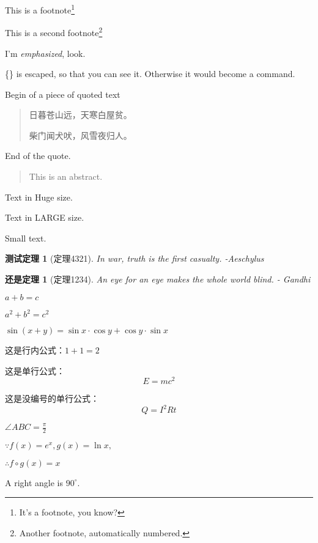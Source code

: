 \documentclass[UTF8]{ctexart}
\begin{document}
This is a footnote\footnote{It's a footnote, you know?}

This is a second footnote\footnote{Another footnote, automatically numbered.}

I'm \emph{emphasized}, look.

\{\} is escaped, so that you can see it. Otherwise it would become a command.

Begin of a piece of quoted text
\begin{quote}
	日暮苍山远，天寒白屋贫。
	
	柴门闻犬吠，风雪夜归人。
\end{quote}

End of the quote.

\begin{abstract}
	This is an abstract.
\end{abstract}

\begin{Huge}
	Text in Huge size.
\end{Huge}

\LARGE{Text in LARGE size.}

\small{Small text.}

\newtheorem{thm1}{测试定理}
\begin{thm1}[定理4321]
	In war, truth is the first casualty. -Aeschylus
\end{thm1}

\newtheorem{thm2}{还是定理}
\begin{thm2}[定理1234]
	An eye for an eye makes the whole world blind. - Gandhi
\end{thm2}

$
a + b = c
$

$
a^2 + b^2 = c^2
$

$\sin{(x + y)} = \sin{x} \cdot \cos{y} + \cos{y} \cdot \sin{x}$

这是行内公式：$1 + 1 = 2$

这是单行公式：
\begin{equation}
E = m c ^ 2
\end{equation}

这是没编号的单行公式：
\begin{equation*}
Q = I ^ 2 Rt\nonumber
\end{equation*}

$\angle ABC = \frac{\pi}{2}$

$\because f(x) = e^x, g(x) = \ln{x}, $

$\therefore f \circ g(x) = x$

A right angle is $90 ^ \circ$.
\end{document}
